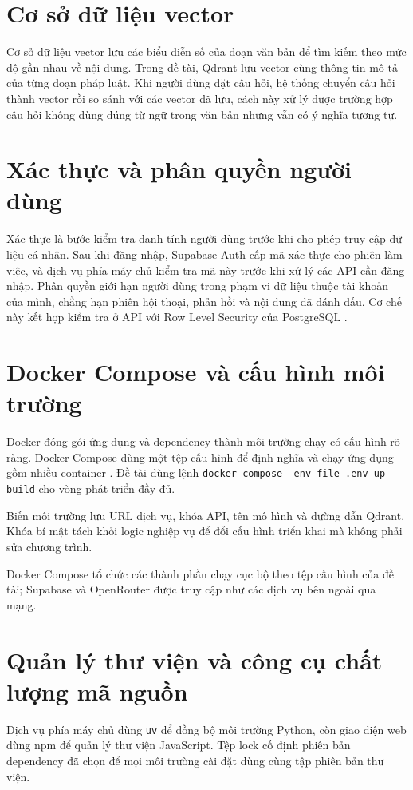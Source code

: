 \documentclass[12pt,a4paper,oneside]{report}
\begin{document}
\section{Cơ sở dữ liệu vector}
Cơ sở dữ liệu vector lưu các biểu diễn số của đoạn văn bản để tìm kiếm theo mức độ gần nhau về nội dung. Trong đề tài, Qdrant lưu vector cùng thông tin mô tả của từng đoạn pháp luật. Khi người dùng đặt câu hỏi, hệ thống chuyển câu hỏi thành vector rồi so sánh với các vector đã lưu, cách này xử lý được trường hợp câu hỏi không dùng đúng từ ngữ trong văn bản nhưng vẫn có ý nghĩa tương tự.

\section{Xác thực và phân quyền người dùng}
Xác thực là bước kiểm tra danh tính người dùng trước khi cho phép truy cập dữ liệu cá nhân. Sau khi đăng nhập, Supabase Auth cấp mã xác thực cho phiên làm việc, và dịch vụ phía máy chủ kiểm tra mã này trước khi xử lý các API cần đăng nhập. Phân quyền giới hạn người dùng trong phạm vi dữ liệu thuộc tài khoản của mình, chẳng hạn phiên hội thoại, phản hồi và nội dung đã đánh dấu. Cơ chế này kết hợp kiểm tra ở API với Row Level Security của PostgreSQL \cite{supabase_auth_docs,supabase_rls_docs}.

\section{Docker Compose và cấu hình môi trường}
Docker đóng gói ứng dụng và dependency thành môi trường chạy có cấu hình rõ ràng. Docker Compose dùng một tệp cấu hình để định nghĩa và chạy ứng dụng gồm nhiều container \cite{docker_compose_docs}. Đề tài dùng lệnh \texttt{docker compose --env-file .env up --build} cho vòng phát triển đầy đủ.

Biến môi trường lưu URL dịch vụ, khóa API, tên mô hình và đường dẫn Qdrant. Khóa bí mật tách khỏi logic nghiệp vụ để đổi cấu hình triển khai mà không phải sửa chương trình.

Docker Compose tổ chức các thành phần chạy cục bộ theo tệp cấu hình của đề tài; Supabase và OpenRouter được truy cập như các dịch vụ bên ngoài qua mạng.


\section{Quản lý thư viện và công cụ chất lượng mã nguồn}
Dịch vụ phía máy chủ dùng \texttt{uv} để đồng bộ môi trường Python, còn giao diện web dùng npm để quản lý thư viện JavaScript. Tệp lock cố định phiên bản dependency đã chọn để mọi môi trường cài đặt dùng cùng tập phiên bản thư viện.
\end{document}
